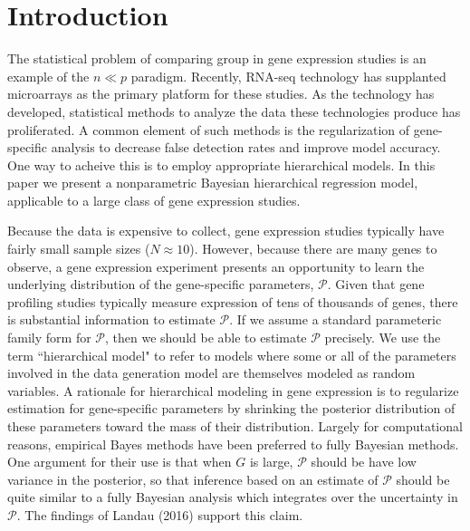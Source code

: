 \newcommand{\op}{\operatorname}
\newcommand{\ind}{\stackrel{ind.}{\sim}}
\section{Introduction}
The statistical problem of comparing group in gene expression studies is an example of the $n \ll p$ paradigm. Recently, RNA-seq technology has supplanted microarrays as the primary platform for these studies. As the technology has developed, statistical methods to analyze the data these technologies produce has proliferated. A common element of such methods is the regularization of gene-specific analysis to decrease false detection rates and improve model accuracy. One way to acheive this is to employ appropriate hierarchical models. In this paper we present a nonparametric Bayesian hierarchical regression model, applicable to a large class of gene expression studies.


Because the data is expensive to collect, gene expression studies typically have fairly small sample sizes ($N \approx 10$). However, because there are many genes to observe, a gene expression experiment presents an opportunity to learn the underlying distribution of the gene-specific parameters, $\mathcal{P}$. Given that gene profiling studies typically measure expression of tens of thousands of genes, there is substantial information to estimate $\mathcal{P}$. If we assume a standard parameteric family form for $\mathcal{P}$, then we should be able to estimate $\mathcal{P}$ precisely. We use the term ``hierarchical model" to refer to models where some or all of the parameters involved in the data generation model are themselves modeled as random variables.
A rationale for hierarchical modeling in gene expression is to regularize estimation for gene-specific parameters by shrinking the posterior distribution of these parameters toward the mass of their distribution. Largely for computational reasons, empirical Bayes methods have been preferred to fully Bayesian methods. One argument for their use is that when $G$ is large, $\mathcal{P}$ should be have low variance in the posterior, so that inference based on an estimate of $\mathcal{P}$ should be quite similar to a fully Bayesian analysis which integrates over the uncertainty in $\mathcal{P}$. The findings of Landau (2016) support this claim.

